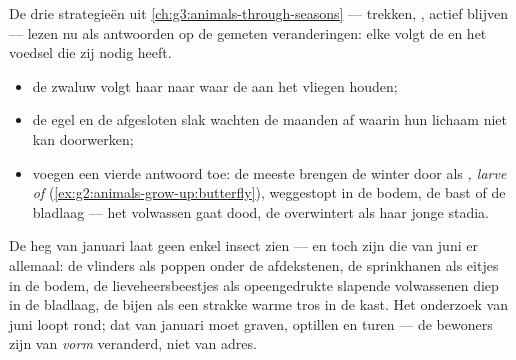 \begin{proposition}\label{prop:g6:life-through-seasons:animals}
De drie strategieën uit \cref{ch:g3:animals-through-seasons} --- trekken,
, actief blijven --- lezen nu als antwoorden op de gemeten
veranderingen: elke  volgt de  en het voedsel die zij
nodig heeft.
\begin{itemize}
  \item de zwaluw volgt haar  naar waar de
          aan het vliegen houden;
  \item de egel en de afgesloten slak wachten de maanden af waarin hun
        lichaam niet kan doorwerken;
  \item {} voegen een vierde antwoord toe: de meeste brengen de
        winter door als \emph{, larve of }
        (\cref{ex:g2:animals-grow-up:butterfly}), weggestopt in de
        bodem, de bast of de bladlaag --- het volwassen  gaat dood,
        de  overwintert als haar jonge stadia.
\end{itemize}
\end{proposition}
\admitted

\begin{example}\label{ex:g6:life-through-seasons:insects}
De heg van januari laat geen enkel insect zien --- en toch zijn die van
juni er allemaal: de vlinders als poppen onder de afdekstenen, de
sprinkhanen als eitjes in de bodem, de lieveheersbeestjes als
opeengedrukte slapende volwassenen diep in de bladlaag, de bijen als een
strakke warme tros in de kast. Het onderzoek van juni loopt rond; dat van
januari moet graven, optillen en turen --- de bewoners zijn van
\emph{vorm} veranderd, niet van adres.
\end{example}

